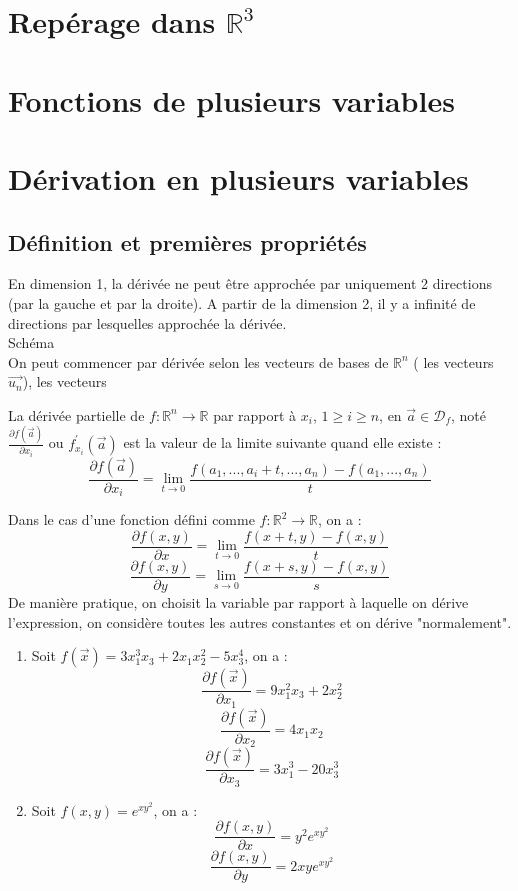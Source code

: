 \chapter{Repérage dans $\mathbb{R}^3$}
\chapter{Fonctions de plusieurs variables}
\chapter{Dérivation en plusieurs variables}
\section{Définition et premières propriétés}
 En dimension 1, la dérivée ne peut être approchée par uniquement 2 directions (par la gauche et par la droite).
 A partir de la dimension 2, il y a infinité de directions par lesquelles approchée la dérivée.\\
 \newline
 Schéma\\
On peut commencer par dérivée selon les vecteurs de bases de $\mathbb{R}^n$ ( les vecteurs $\overrightarrow{u_n}$), les vecteurs
\begin{defi}
    La dérivée partielle de $f:\mathbb{R}^n\to\mathbb{R}$ par rapport à $x_i$, $1\ge i\ge n$, en $\overrightarrow{a}\in\mathscr{D}_f$, noté $\frac{\partial f(\overrightarrow{a})}{\partial x_i}$ ou $f^{\prime}_{x_i}(\overrightarrow{a})$ est la valeur de la limite suivante quand elle existe :
    $$\frac{\partial f(\overrightarrow{a})}{\partial x_i}=\lim_{t\to 0}\frac{f(a_1,...,a_i+t,...,a_n)-f(a_1,...,a_n)}{t}$$
\end{defi}
Dans le cas d'une fonction défini comme $f:\mathbb{R}^2\to\mathbb{R}$, on a :\\
$$\frac{\partial f(x,y)}{\partial x} = \lim_{t\to 0}\frac{f(x+t,y)-f(x,y)}{t}$$
$$\frac{\partial f(x,y)}{\partial y} = \lim_{s\to 0}\frac{f(x+s,y)-f(x,y)}{s}$$
De manière pratique, on choisit la variable par rapport à laquelle on dérive l'expression, on considère toutes les autres constantes et on dérive "normalement".
\begin{ex}
\begin{enumerate}
    \item Soit $f(\overrightarrow{x})=3x_1^3x_3+2x_1x_2^2-5x_3^4$, on a :
    $$\frac{\partial f(\overrightarrow{x})}{\partial x_1} = 9x_1^2x_3+2x_2^2 $$
    $$\frac{\partial f(\overrightarrow{x})}{\partial x_2} = 4x_1x_2$$
    $$\frac{\partial f(\overrightarrow{x})}{\partial x_3} = 3x_1^3-20x_3^3$$
    \item Soit $f(x,y)=e^{xy^2}$, on a :
    $$\frac{\partial f(x,y)}{\partial x} = y^2e^{xy^2}$$
    $$\frac{\partial f(x,y)}{\partial y} = 2xye^{xy^2}$$
\end{enumerate}
\end{ex}
